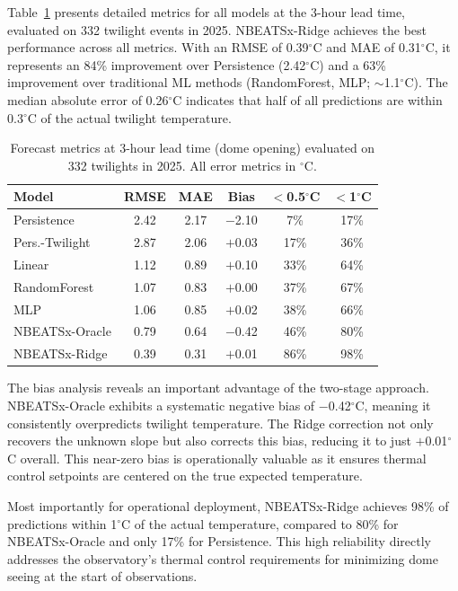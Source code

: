 \documentclass[twocolumn]{aastex631}
\begin{document}
Table~\ref{tab:3h_metrics} presents detailed metrics for all models at the 3-hour lead time, evaluated on 332 twilight events in 2025. NBEATSx-Ridge achieves the best performance across all metrics. With an RMSE of 0.39$^\circ$C and MAE of 0.31$^\circ$C, it represents an 84\% improvement over Persistence (2.42$^\circ$C) and a 63\% improvement over traditional ML methods (RandomForest, MLP; $\sim$1.1$^\circ$C). The median absolute error of 0.26$^\circ$C indicates that half of all predictions are within 0.3$^\circ$C of the actual twilight temperature.

\begin{table}[htb!]
\centering
\small
\caption{Forecast metrics at 3-hour lead time (dome opening) evaluated on 332 twilights in 2025. All error metrics in $^\circ$C.}
\label{tab:3h_metrics}
\begin{tabular}{lccccc}
\toprule
Model & RMSE & MAE & Bias & $<$0.5$^\circ$C & $<$1$^\circ$C \\
\midrule
Persistence & 2.42 & 2.17 & $-$2.10 & 7\% & 17\% \\
Pers.-Twilight & 2.87 & 2.06 & $+$0.03 & 17\% & 36\% \\
Linear & 1.12 & 0.89 & $+$0.10 & 33\% & 64\% \\
RandomForest & 1.07 & 0.83 & $+$0.00 & 37\% & 67\% \\
MLP & 1.06 & 0.85 & $+$0.02 & 38\% & 66\% \\
NBEATSx-Oracle & 0.79 & 0.64 & $-$0.42 & 46\% & 80\% \\
\midrule
NBEATSx-Ridge & 0.39 & 0.31 & $+$0.01 & 86\% & 98\% \\
\bottomrule
\end{tabular}
\end{table}

The bias analysis reveals an important advantage of the two-stage approach. NBEATSx-Oracle exhibits a systematic negative bias of $-$0.42$^\circ$C, meaning it consistently overpredicts twilight temperature. The Ridge correction not only recovers the unknown slope but also corrects this bias, reducing it to just $+$0.01$^\circ$C overall. This near-zero bias is operationally valuable as it ensures thermal control setpoints are centered on the true expected temperature.

Most importantly for operational deployment, NBEATSx-Ridge achieves 98\% of predictions within 1$^\circ$C of the actual temperature, compared to 80\% for NBEATSx-Oracle and only 17\% for Persistence. This high reliability directly addresses the observatory's thermal control requirements for minimizing dome seeing at the start of observations.
\end{document}
